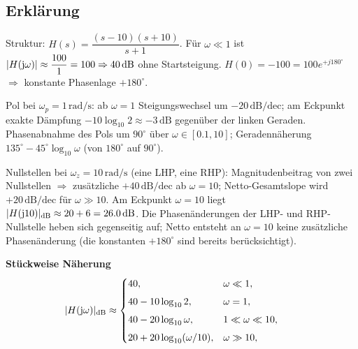 \subsection{Erklärung}
\vspace{5mm}
\begin{description}[leftmargin=1.2em,labelsep=.6em,font=\bfseries]
\item[Schritt 1] Struktur: $H(s)=\dfrac{(s-10)(s+10)}{s+1}$. Für $\omega\ll1$ ist $|H(\operatorname{j}\!\omega)|\approx\dfrac{100}{1}=100\Rightarrow 40\,\mathrm{dB}$ ohne Startsteigung. $H(0) = -100 = 100 e^{+j180^\circ}$ $\Rightarrow$ konstante Phasenlage $+180^\circ$.
\item[Schritt 2] Pol bei $\omega_p=1\,\mathrm{rad/s}$: ab $\omega=1$ Steigungswechsel um $-20\,\mathrm{dB/dec}$; am Eckpunkt exakte Dämpfung $-10\log_{10}2\approx-3\,\mathrm{dB}$ gegenüber der linken Geraden. Phasenabnahme des Pols um $90^\circ$ über $\omega\in[0.1,10]$; Geradennäherung $135^\circ-45^\circ\log_{10}\omega$ (von $180^\circ$ auf $90^\circ$).
\item[Schritt 3] Nullstellen bei $\omega_z=10\,\mathrm{rad/s}$ (eine LHP, eine RHP): Magnitudenbeitrag von zwei Nullstellen $\Rightarrow$ zusätzliche $+40\,\mathrm{dB/dec}$ ab $\omega=10$; Netto-Gesamtslope wird $+20\,\mathrm{dB/dec}$ für $\omega\gg10$. Am Eckpunkt $\omega=10$ liegt $|H(\operatorname{j}\!10)|_{\mathrm{dB}}\approx20+6=26.0\,\mathrm{dB}$. Die Phasenänderungen der LHP- und RHP-Nullstelle heben sich gegenseitig auf; Netto entsteht an $\omega=10$ keine zusätzliche Phasenänderung (die konstanten $+180^\circ$ sind bereits berücksichtigt).
\end{description}

\vspace{0.5cm}
\medskip
\noindent\textbf{Stückweise Näherung}
\[
|H(\operatorname{j}\!\omega)|_{\mathrm{dB}}\approx
\begin{cases}
40,& \omega\ll1,\\[4pt]
40-10\log_{10}2,& \omega=1,\\[4pt]
40-20\log_{10}\omega,& 1\ll\omega\ll10,\\[4pt]
20+20\log_{10}(\omega/10),& \omega\gg10,
\end{cases}
\qquad
\]
\newpage